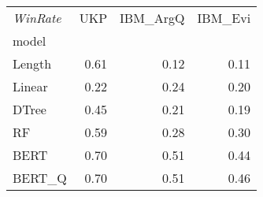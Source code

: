 \begin{tabular}{lrrr}
\toprule
\textit{WinRate} &   UKP &  IBM\_ArgQ &  IBM\_Evi \\
model  &       &           &          \\
\midrule
Length &  0.61 &      0.12 &     0.11 \\
Linear &  0.22 &      0.24 &     0.20 \\
DTree  &  0.45 &      0.21 &     0.19 \\
RF     &  0.59 &      0.28 &     0.30 \\
BERT   &  0.70 &      0.51 &     0.44 \\
BERT\_Q &  0.70 &      0.51 &     0.46 \\
\bottomrule
\end{tabular}

